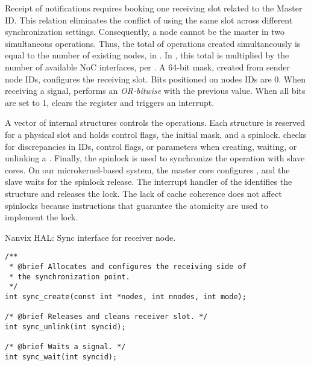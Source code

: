 				Receipt of notifications requires booking one \cnoc receiving slot
				related to the Master ID. This relation eliminates the conflict of
				using the same slot across different synchronization settings.
				Consequently, a node cannot be the master in two simultaneous operations.
				Thus, the total of \sync operations created simultaneously is equal to the number
				of existing nodes,  in \mppa. In \ioclusters, this total is
				multiplied by the number of available NoC interfaces,  per \dma.
				A 64-bit mask, created from sender node IDs, configures the receiving
				slot. Bits positioned on nodes IDs are 0. When receiving a signal,
				\dma performs an \textit{OR-bitwise} with the previous value. When
				all bits are set to 1, \dma clears the register and triggers an interrupt.

				A vector of internal structures controls the operations. Each structure
				is reserved for a physical slot and holds control flags, the initial mask,
				and a spinlock. \hal checks for discrepancies in IDs, control flags, or
				parameters when creating, waiting, or unlinking a \sync. Finally,
				the spinlock is used to synchronize the operation with slave cores.
				On our microkernel-based system, the master core configures \sync, and
				the slave waits for the spinlock release. The interrupt handler of the
				\sync identifies the structure and releases the lock. The lack of cache
				coherence does not affect spinlocks because instructions that guarantee
				the atomicity are used to implement the lock.


\begin{listing}[!tb]
\caption{Nanvix HAL: Sync interface for receiver node.}
\label{code:hal-sync-receiver}
\begin{verbatim}
/**
 * @brief Allocates and configures the receiving side of
 * the synchronization point.
 */
int sync_create(const int *nodes, int nnodes, int mode);

/* @brief Releases and cleans receiver slot. */
int sync_unlink(int syncid);

/* @brief Waits a signal. */
int sync_wait(int syncid);
\end{verbatim}
\end{listing}

